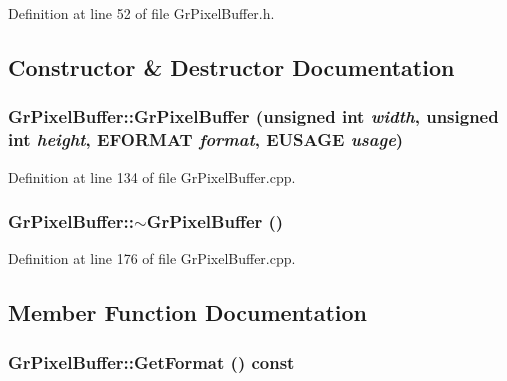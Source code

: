\begin{CompactItemize}
Definition at line 52 of file GrPixelBuffer.h.

\subsection{Constructor \& Destructor Documentation}
\hypertarget{class_gr_pixel_buffer_0aa229949b83ad90d393ad926714dd0c}{
\subsubsection[{GrPixelBuffer}]{\setlength{\rightskip}{0pt plus 5cm}GrPixelBuffer::GrPixelBuffer (unsigned int {\em width}, \/  unsigned int {\em height}, \/  {\bf EFORMAT} {\em format}, \/  {\bf EUSAGE} {\em usage})}}
\label{class_gr_pixel_buffer_0aa229949b83ad90d393ad926714dd0c}




Definition at line 134 of file GrPixelBuffer.cpp.\hypertarget{class_gr_pixel_buffer_f4613b158302dcab3f6470e886a7339d}{
\subsubsection[{$\sim$GrPixelBuffer}]{\setlength{\rightskip}{0pt plus 5cm}GrPixelBuffer::$\sim$GrPixelBuffer ()}}
\label{class_gr_pixel_buffer_f4613b158302dcab3f6470e886a7339d}




Definition at line 176 of file GrPixelBuffer.cpp.

\subsection{Member Function Documentation}
\hypertarget{class_gr_pixel_buffer_6a144efcc774c07dbcbccc33da72e6b5}{
\subsubsection[{GetFormat}]{ GrPixelBuffer::GetFormat () const}}
\label{class_gr_pixel_buffer_6a144efcc774c07dbcbccc33da72e6b5}





\end{CompactItemize}
